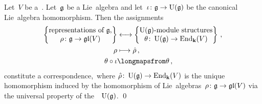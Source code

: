 

\begin{proposition}
  \label{representations are modules}
  Let~$V$ be a~{\vectorspace{$\kf$}}.
  Let~$\mathfrak{g}$ be a Lie~algebra and let~$\iota \colon \mathfrak{g} \to \operatorname{U}(\mathfrak{g})$ be the canonical Lie~algebra homomorphism.
  Then the assignments
  \begin{align*}
    \left\{
    \begin{tabular}{@{}c@{}}
      representations of~$\glie$, \\
      $\rho \colon \glie \to \gllie(V)$
    \end{tabular}
    \right\}
    &\longonetoone
    \left\{
    \begin{tabular}{@{}c@{}}
      $\Univ(\glie)$-module structures \\
      $\theta \colon \Univ(\glie) \to \End_{\kf}(V)$
    \end{tabular}
    \right\}  \,,
    \\
    \rho
    &\longmapsto
    \hat{\rho} \,,
    \\
    \theta \circ \iota
    &\longmapsfrom
    \theta  \,,
  \end{align*}
  constitute a {\onetoone} correspondence,~where $\hat{\rho} \colon \operatorname{U}(\mathfrak{g}) \to \operatorname{End}_{\mathbf{k}}(V)$ is the unique~\algebra{$\kf$} homomorphism induced by the homomorphism of Lie~algebras~$\rho \colon \mathfrak{g} \to \mathfrak{gl}(V)$ via the universal property of the~{\ua}~$\operatorname{U}(\mathfrak{g})$.
  \qed
\end{proposition}


